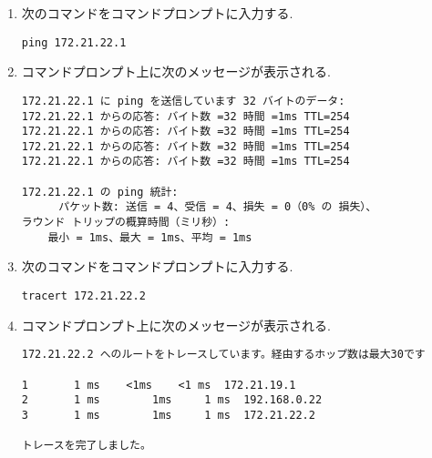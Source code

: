 \documentclass[a4j,titlepage]{jarticle}
\begin{document}
\begin{itemize}
\begin{enumerate}
\item 次のコマンドをコマンドプロンプトに入力する.\\
  \begin{center}
    \begin{screen}
\begin{verbatim}
ping 172.21.22.1
\end{verbatim}
    \end{screen}
  \end{center}
\item コマンドプロンプト上に次のメッセージが表示される.\\
    \begin{center}
    \begin{screen}
\begin{verbatim}
172.21.22.1 に ping を送信しています 32 バイトのデータ:
172.21.22.1 からの応答: バイト数 =32 時間 =1ms TTL=254
172.21.22.1 からの応答: バイト数 =32 時間 =1ms TTL=254
172.21.22.1 からの応答: バイト数 =32 時間 =1ms TTL=254
172.21.22.1 からの応答: バイト数 =32 時間 =1ms TTL=254

172.21.22.1 の ping 統計:
    　パケット数: 送信 = 4、受信 = 4、損失 = 0（0% の 損失）、
ラウンド トリップの概算時間（ミリ秒）:
    最小 = 1ms、最大 = 1ms、平均 = 1ms 
\end{verbatim}
    \end{screen}
  \end{center}

\item 次のコマンドをコマンドプロンプトに入力する.
  \begin{center}
    \begin{screen}
\begin{verbatim}
tracert 172.21.22.2
\end{verbatim}
    \end{screen}
  \end{center}
\item コマンドプロンプト上に次のメッセージが表示される.\\
    \begin{center}
    \begin{screen}
\begin{verbatim}
172.21.22.2 へのルートをトレースしています。経由するホップ数は最大30です

1       1 ms    <1ms    <1 ms  172.21.19.1
2       1 ms	    1ms     1 ms  192.168.0.22
3       1 ms	    1ms     1 ms  172.21.22.2

トレースを完了しました。
\end{verbatim}
    \end{screen}
  \end{center}
\end{enumerate}




\end{itemize}
\end{document}
